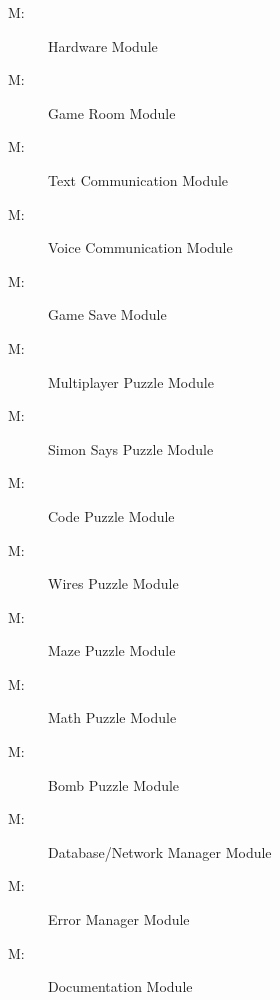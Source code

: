\documentclass[12pt, titlepage]{article}
\newcounter{mnum}
\newcommand{\mthemnum}{M\themnum}
\begin{document}
\begin{description}
\item [ \mthemnum \label{mHardware}:] Hardware Module

\item [ \mthemnum \label{mGameRoom}:] Game Room Module
\item [ \mthemnum \label{mText}:] Text Communication Module
\item [ \mthemnum \label{mVoice}:] Voice Communication Module
\item [ \mthemnum \label{mGameSave}:] Game Save Module
\item [ \mthemnum \label{mMultiplayerPuzzle}:] Multiplayer Puzzle Module

\item 
[ \mthemnum \label{mPSimon}:] Simon Says Puzzle Module
\item 
[ \mthemnum \label{mPCode}:] Code Puzzle Module
\item 
[ \mthemnum \label{mPWires}:] Wires Puzzle Module
\item 
[ \mthemnum \label{mPMaze}:] Maze Puzzle Module
\item 
[ \mthemnum \label{mPMath}:] Math Puzzle Module
\item 
[ \mthemnum \label{mPBomb}:] Bomb Puzzle Module
\item [ \mthemnum \label{mDatabase}:] Database/Network Manager Module
\item [ \mthemnum \label{mErrorManager}:] Error Manager Module
\item [ \mthemnum \label{mDoc}:] Documentation Module
\end{description}
\end{document}

